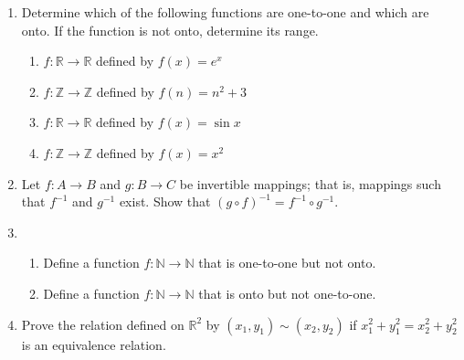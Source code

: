 {\begin{enumerate}
\begin{multicols}{2}
\begin{enumerate}
\item 
$\displaystyle f(p/q) = \frac{p+ 1}{p - 2}$

\item 
$\displaystyle f(p/q) = \frac{3p}{3q}$

\item 
$\displaystyle f(p/q) = \frac{p+q}{q^2}$

\item 
$\displaystyle f(p/q) = \frac{3 p^2}{7 q^2} - \frac{p}{q}$

\end{enumerate}
\end{multicols}
 
\item
Determine which of the following functions are one-to-one and which are onto.  If the function is not onto, determine its range.
\begin{enumerate} 
 
\item
$f: {\mathbb R} \rightarrow {\mathbb R}$ defined by $f(x) = e^x$
 
\item
$f: {\mathbb Z} \rightarrow {\mathbb Z}$ defined by $f(n) = n^2 + 3$
  
\item
$f: {\mathbb R} \rightarrow {\mathbb R}$ defined by $f(x) = \sin x$
 
\item
$f: {\mathbb Z} \rightarrow {\mathbb Z}$ defined by $f(x) = x^2$
 
\end{enumerate}
 
\item
Let $f :A \rightarrow B$ and $g : B \rightarrow C$ be invertible mappings; that is, mappings such that $f^{-1}$ and $g^{-1}$ exist.  Show that $(g \circ f)^{-1} =f^{-1} \circ g^{-1}$. 

\item
\begin{enumerate}
  
\item
Define a function $f: {\mathbb N} \rightarrow {\mathbb N}$ that is one-to-one but not onto. 
 
\item
Define a function $f: {\mathbb N} \rightarrow {\mathbb N}$ that is onto but not one-to-one. 
 
\end{enumerate}
 
\item
Prove the relation defined on ${\mathbb R}^2$ by $(x_1, y_1 ) \sim (x_2, y_2)$ if $x_1^2 + y_1^2 = x_2^2 + y_2^2$ is  an equivalence relation. 
 

\end{enumerate}}
